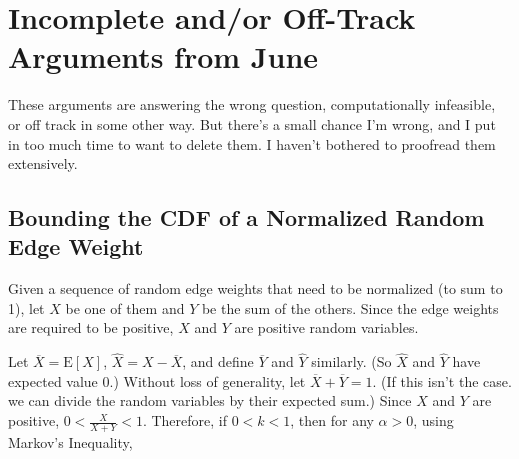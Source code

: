 \documentclass{article}
\newcommand \E[1] {\mathrm E \left[#1\right]} %
\begin{document}
%
%
%
%
%


\nocite{Constantine:2009:Random}



%

\section{Incomplete and/or Off-Track Arguments from June}

These arguments are answering the wrong question, computationally infeasible, or off track in some other way. But there's a small chance I'm wrong, and I put in too much time to want to delete them. I haven't bothered to proofread them extensively.

\subsection{Bounding the CDF of a Normalized Random Edge Weight}

Given a sequence of random edge weights that need to be normalized (to sum to 1), let $X$ be one of them and $Y$ be the sum of the others. Since the edge weights are required to be positive, $X$ and $Y$ are positive random variables.

Let $\overline X = \E X$, $\hat X=X-\overline X$, and define $\overline Y$ and $\hat Y$ similarly. (So $\hat X$ and $\hat Y$ have expected value 0.) Without loss of generality, let $\overline X+\overline Y=1$. (If this isn't the case. we can divide the random variables by their expected sum.) Since $X$ and $Y$ are positive, $0<\frac X{X+Y}<1$. Therefore, if $0<k<1$, then for any $\alpha>0$, using Markov's Inequality,
\end{document}
